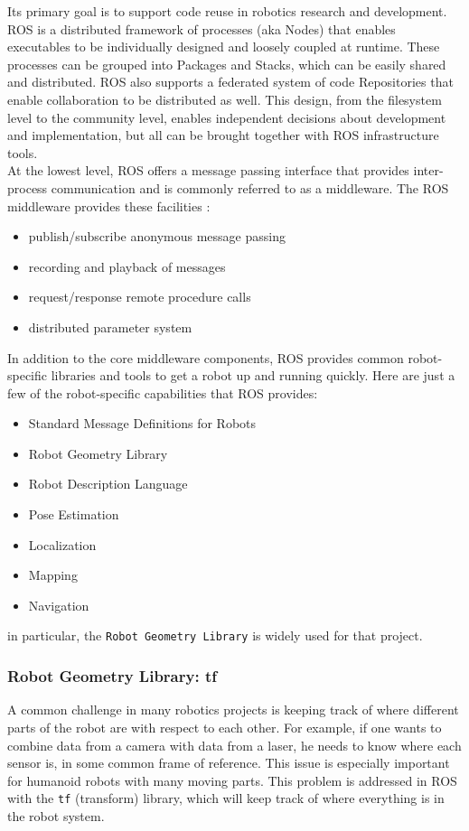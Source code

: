 \begin{displayquote}
Its primary goal is to support code reuse in robotics research and development. \ac{ROS} is a distributed framework of processes (aka Nodes) that enables executables to be individually designed and loosely coupled at runtime. These processes can be grouped into Packages and Stacks, which can be easily shared and distributed. \ac{ROS} also supports a federated system of code Repositories that enable collaboration to be distributed as well. This design, from the filesystem level to the community level, enables independent decisions about development and implementation, but all can be brought together with \ac{ROS} infrastructure tools.\\
At the lowest level, \ac{ROS} offers a message passing interface that provides inter-process communication and is commonly referred to as a middleware.
The \ac{ROS} middleware provides these facilities \cite{ros:core-components}:
\begin{itemize}
    \item publish/subscribe anonymous message passing
    \item recording and playback of messages
    \item request/response remote procedure calls
    \item distributed parameter system
\end{itemize}
In addition to the core middleware components, \ac{ROS} provides common robot-specific libraries and tools to get a robot up and running quickly. Here are just a few of the robot-specific capabilities that \ac{ROS} provides:
\begin{itemize}
    \item Standard Message Definitions for Robots
    \item Robot Geometry Library
    \item Robot Description Language
    \item Pose Estimation
    \item Localization
    \item Mapping
    \item Navigation
\end{itemize}
\end{displayquote}
in particular, the \texttt{Robot Geometry Library} is widely used for that project.
\subsubsection*{Robot Geometry Library: tf}
A common challenge in many robotics projects is keeping track of where different parts of the robot are with respect to each other. For example, if one wants to combine data from a camera with data from a laser, he needs to know where each sensor is, in some common frame of reference. This issue is especially important for humanoid robots with many moving parts. This problem is addressed in \ac{ROS} with the \texttt{tf} (transform) library, which will keep track of where everything is in the robot system.

